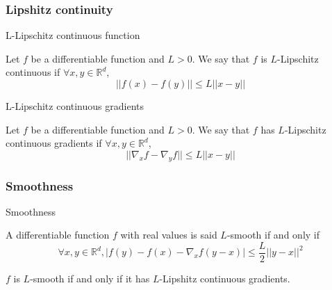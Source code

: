 \documentclass[
10pt, %
a4paper, %
oneside, %
headinclude,footinclude, %
BCOR5mm, %
]{scrartcl}
\begin{document}
\subsubsection{\large\color{Periwinkle}Lipshitz continuity}
\label{def:lipshitz}

\begin{definition}{L-Lipschitz continuous function}

    Let $f$ be a differentiable function and $L>0$. We say that $f$ is $L$-Lipschitz continuous if $\forall x,y\in \mathbb{R}^d$, 
    \begin{equation*}
	||f(x)-f(y)||\leq L||x-y||
    \end{equation*}
\end{definition}

\begin{definition}{L-Lipschitz continuous gradients}

    Let $f$ be a differentiable function and $L>0$. We say that $f$ has $L$-Lipschitz continuous gradients if $\forall x,y\in \mathbb{R}^d$, 
    \begin{equation*}
	||\nabla_xf-\nabla_yf||\leq L||x-y||
    \end{equation*}
\end{definition}


\subsubsection{\large\color{Periwinkle}Smoothness}

\begin{definition}{Smoothness}

    A differentiable function $f$ with real values is said $L$-smooth if and only if
    \begin{equation*}
	\forall x, y\in \mathbb{R}^d, |f(y)-f(x)-\nabla_xf(y-x)|\leq \frac{L}{2} ||y-x||^2
    \end{equation*}
\end{definition}

\begin{lemma}
    $f$ is $L$-smooth if and only if it has $L$-Lipshitz continuous gradients.
\end{lemma}
\end{document}
